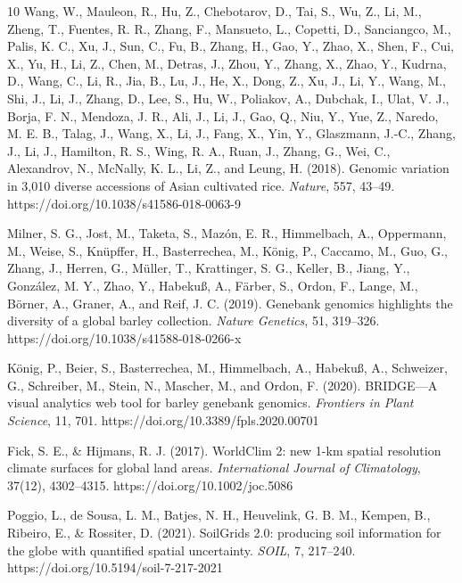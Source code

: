 \documentclass[unnumsec,webpdf,contemporary,large]{oup-authoring-template}%
\theoremstyle{thmstyleone}%
\theoremstyle{thmstyletwo}%
\theoremstyle{thmstylethree}%
\begin{document}
\begin{thebibliography}{10}
Wang, W., Mauleon, R., Hu, Z., Chebotarov, D., Tai, S., Wu, Z., Li, M., Zheng, T., Fuentes, R. R., Zhang, F., Mansueto, L., Copetti, D., Sanciangco, M., Palis, K. C., Xu, J., Sun, C., Fu, B., Zhang, H., Gao, Y., Zhao, X., Shen, F., Cui, X., Yu, H., Li, Z., Chen, M., Detras, J., Zhou, Y., Zhang, X., Zhao, Y., Kudrna, D., Wang, C., Li, R., Jia, B., Lu, J., He, X., Dong, Z., Xu, J., Li, Y., Wang, M., Shi, J., Li, J., Zhang, D., Lee, S., Hu, W., Poliakov, A., Dubchak, I., Ulat, V. J., Borja, F. N., Mendoza, J. R., Ali, J., Li, J., Gao, Q., Niu, Y., Yue, Z., Naredo, M. E. B., Talag, J., Wang, X., Li, J., Fang, X., Yin, Y., Glaszmann, J.-C., Zhang, J., Li, J., Hamilton, R. S., Wing, R. A., Ruan, J., Zhang, G., Wei, C., Alexandrov, N., McNally, K. L., Li, Z., and Leung, H. (2018).
Genomic variation in 3,010 diverse accessions of Asian cultivated rice.
\textit{Nature}, 557, 43--49.
https://doi.org/10.1038/s41586-018-0063-9

Milner, S. G., Jost, M., Taketa, S., Maz{\'o}n, E. R., Himmelbach, A., Oppermann, M., Weise, S., Kn{\"u}pffer, H., Basterrechea, M., K{\"o}nig, P., Caccamo, M., Guo, G., Zhang, J., Herren, G., M{\"u}ller, T., Krattinger, S. G., Keller, B., Jiang, Y., Gonz{\'a}lez, M. Y., Zhao, Y., Habeku{\ss}, A., F{\"a}rber, S., Ordon, F., Lange, M., B{\"o}rner, A., Graner, A., and Reif, J. C. (2019).
Genebank genomics highlights the diversity of a global barley collection.
\textit{Nature Genetics}, 51, 319--326.
https://doi.org/10.1038/s41588-018-0266-x

K{\"o}nig, P., Beier, S., Basterrechea, M., Himmelbach, A., Habeku{\ss}, A., Schweizer, G., Schreiber, M., Stein, N., Mascher, M., and Ordon, F. (2020).
BRIDGE---A visual analytics web tool for barley genebank genomics.
\textit{Frontiers in Plant Science}, 11, 701.
https://doi.org/10.3389/fpls.2020.00701

Fick, S. E., \& Hijmans, R. J. (2017).
WorldClim 2: new 1-km spatial resolution climate surfaces for global land areas.
\textit{International Journal of Climatology}, 37(12), 4302--4315.
https://doi.org/10.1002/joc.5086

Poggio, L., de Sousa, L. M., Batjes, N. H., Heuvelink, G. B. M., Kempen, B., Ribeiro, E., \& Rossiter, D. (2021).
SoilGrids 2.0: producing soil information for the globe with quantified spatial uncertainty.
\textit{SOIL}, 7, 217--240.
https://doi.org/10.5194/soil-7-217-2021


\end{thebibliography}
\end{document}
